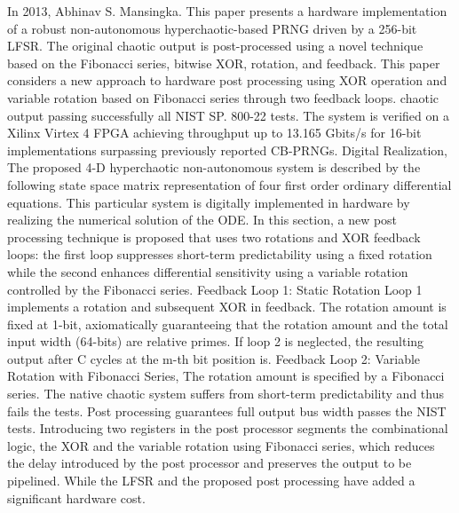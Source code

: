 In 2013, Abhinav S. Mansingka. This paper presents a hardware implementation of a robust non-autonomous hyperchaotic-based PRNG driven by a 256-bit LFSR. The original chaotic output is post-processed using a novel technique based on the Fibonacci series, bitwise XOR, rotation, and feedback. This paper considers a new approach to hardware post processing using XOR operation and variable rotation based on Fibonacci series through two feedback loops. chaotic output passing successfully all NIST SP. 800-22 tests. The system is verified on a Xilinx Virtex 4 FPGA achieving throughput up to 13.165 Gbits/s for 16-bit implementations surpassing previously reported CB-PRNGs.  Digital Realization, The proposed 4-D hyperchaotic non-autonomous system is described by the following state space matrix representation of four first order ordinary differential equations. This particular system is digitally implemented in hardware by realizing the numerical solution of the ODE. In this section, a new post processing technique is proposed that uses two rotations and XOR feedback loops: the first loop suppresses short-term predictability using a fixed rotation while the second enhances differential sensitivity using a variable rotation controlled by the Fibonacci series. Feedback Loop 1: Static Rotation Loop 1 implements a rotation and subsequent XOR in feedback. The rotation amount is fixed at 1-bit, axiomatically guaranteeing that the rotation amount and the total input width (64-bits) are relative primes. If loop 2 is neglected, the resulting output after C cycles at the m-th bit position is. Feedback Loop 2: Variable Rotation with Fibonacci Series,  The rotation amount is specified by a Fibonacci series. The native chaotic system suffers from short-term predictability and thus fails the tests. Post processing guarantees full output bus width passes the NIST tests.  Introducing two registers in the post processor segments the combinational logic, the XOR and the variable rotation using Fibonacci series, which reduces the delay introduced by the post processor and preserves the output to be pipelined. While the LFSR and the proposed post processing have added a significant hardware cost.

